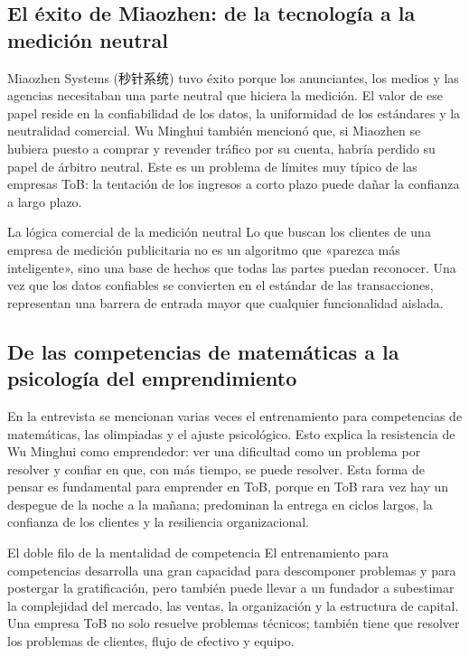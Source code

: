 \documentclass[a4paper]{article}
\begin{document}
\subsection{El éxito de Miaozhen: de la tecnología a la medición neutral}

Miaozhen Systems (秒针系统) tuvo éxito porque los anunciantes, los medios y las agencias necesitaban una parte neutral que hiciera la medición. El valor de ese papel reside en la confiabilidad de los datos, la uniformidad de los estándares y la neutralidad comercial. Wu Minghui también mencionó que, si Miaozhen se hubiera puesto a comprar y revender tráfico por su cuenta, habría perdido su papel de árbitro neutral. Este es un problema de límites muy típico de las empresas ToB: la tentación de los ingresos a corto plazo puede dañar la confianza a largo plazo.

\begin{knowledgebox}{La lógica comercial de la medición neutral}
Lo que buscan los clientes de una empresa de medición publicitaria no es un algoritmo que «parezca más inteligente», sino una base de hechos que todas las partes puedan reconocer. Una vez que los datos confiables se convierten en el estándar de las transacciones, representan una barrera de entrada mayor que cualquier funcionalidad aislada.
\end{knowledgebox}

\subsection{De las competencias de matemáticas a la psicología del emprendimiento}

En la entrevista se mencionan varias veces el entrenamiento para competencias de matemáticas, las olimpiadas y el ajuste psicológico. Esto explica la resistencia de Wu Minghui como emprendedor: ver una dificultad como un problema por resolver y confiar en que, con más tiempo, se puede resolver. Esta forma de pensar es fundamental para emprender en ToB, porque en ToB rara vez hay un despegue de la noche a la mañana; predominan la entrega en ciclos largos, la confianza de los clientes y la resiliencia organizacional.

\begin{warningbox}{El doble filo de la mentalidad de competencia}
El entrenamiento para competencias desarrolla una gran capacidad para descomponer problemas y para postergar la gratificación, pero también puede llevar a un fundador a subestimar la complejidad del mercado, las ventas, la organización y la estructura de capital. Una empresa ToB no solo resuelve problemas técnicos; también tiene que resolver los problemas de clientes, flujo de efectivo y equipo.
\end{warningbox}
\end{document}
